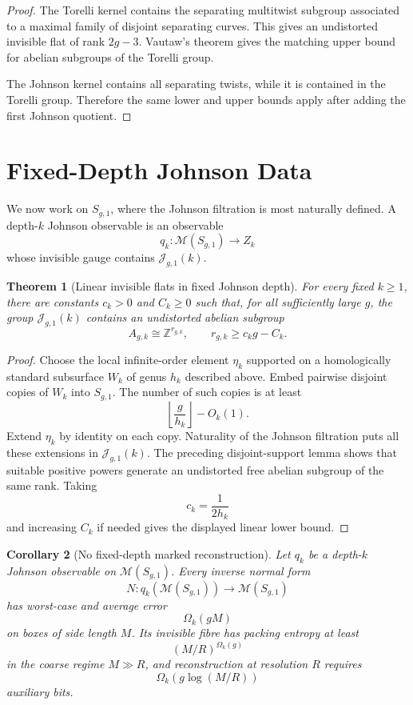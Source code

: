 \documentclass[11pt]{article}
\newtheorem{theorem}{Theorem}[section]
\newtheorem{corollary}[theorem]{Corollary}
\begin{document}
\begin{proof}
The Torelli kernel contains the separating multitwist subgroup associated to a
maximal family of disjoint separating curves.  This gives an undistorted
invisible flat of rank \(2g-3\).  Vautaw's theorem gives the matching upper
bound for abelian subgroups of the Torelli group.

The Johnson kernel contains all separating twists, while it is contained in the
Torelli group.  Therefore the same lower and upper bounds apply after adding the
first Johnson quotient.
\end{proof}

\section{Fixed-Depth Johnson Data}

We now work on \(S_{g,1}\), where the Johnson filtration is most naturally
defined.  A depth-\(k\) Johnson observable is an observable
\[
q_k:\mathcal M(S_{g,1})\to Z_k
\]
whose invisible gauge contains \(\mathcal J_{g,1}(k)\).

\begin{theorem}[Linear invisible flats in fixed Johnson depth]
For every fixed \(k\ge1\), there are constants \(c_k>0\) and \(C_k\ge0\) such
that, for all sufficiently large \(g\), the group \(\mathcal J_{g,1}(k)\)
contains an undistorted abelian subgroup
\[
A_{g,k}\cong\mathbb Z^{r_{g,k}},
\qquad
r_{g,k}\ge c_k g-C_k .
\]
\end{theorem}

\begin{proof}
Choose the local infinite-order element \(\eta_k\) supported on a
homologically standard subsurface \(W_k\) of genus \(h_k\) described above.
Embed pairwise disjoint copies of \(W_k\) into \(S_{g,1}\).  The number of such
copies is at least
\[
\left\lfloor\frac{g}{h_k}\right\rfloor-O_k(1).
\]
Extend \(\eta_k\) by identity on each copy.  Naturality of the Johnson
filtration puts all these extensions in \(\mathcal J_{g,1}(k)\).  The preceding
disjoint-support lemma shows that suitable positive powers generate an
undistorted free abelian subgroup of the same rank.  Taking
\[
c_k=\frac{1}{2h_k}
\]
and increasing \(C_k\) if needed gives the displayed linear lower bound.
\end{proof}

\begin{corollary}[No fixed-depth marked reconstruction]
Let \(q_k\) be a depth-\(k\) Johnson observable on \(\mathcal M(S_{g,1})\).
Every inverse normal form
\[
N:q_k(\mathcal M(S_{g,1}))\to\mathcal M(S_{g,1})
\]
has worst-case and average error
\[
\Omega_k(gM)
\]
on boxes of side length \(M\).  Its invisible fibre has packing entropy at least
\[
(M/R)^{\Omega_k(g)}
\]
in the coarse regime \(M\gg R\), and reconstruction at resolution \(R\) requires
\[
\Omega_k(g\log(M/R))
\]
auxiliary bits.
\end{corollary}
\end{document}

